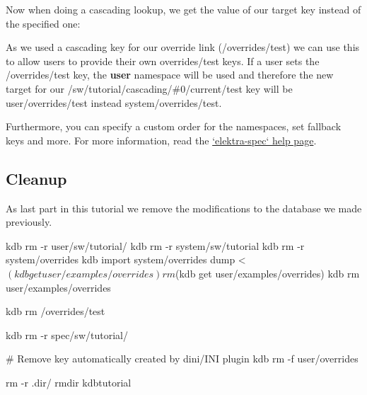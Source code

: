 Now when doing a cascading lookup, we get the value of our target key instead of the specified one\+:




As we used a cascading key for our override link ({\ttfamily /overrides/test}) we can use this to allow users to provide their own {\ttfamily overrides/test} keys. If a user sets the {\ttfamily /overrides/test} key, the {\bfseries user} namespace will be used and therefore the new target for our {\ttfamily /sw/tutorial/cascading/\#0/current/test} key will be {\ttfamily user/overrides/test} instead {\ttfamily system/overrides/test}.




Furthermore, you can specify a custom order for the namespaces, set fallback keys and more. For more information, read the \hyperlink{md_doc_help_elektra-spec_doc_help_elektra-spec_md}{`elektra-\/spec` help page}.

\subsection*{Cleanup}

As last part in this tutorial we remove the modifications to the database we made previously.


\begin{DoxyCode}
kdb rm -r user/sw/tutorial/
kdb rm -r system/sw/tutorial
kdb rm -r system/overrides
kdb import system/overrides dump < $(kdb get user/examples/overrides)
rm $(kdb get user/examples/overrides)
kdb rm user/examples/overrides

kdb rm /overrides/test

kdb rm -r spec/sw/tutorial/

# Remove key automatically created by dini/INI plugin
kdb rm -f user/overrides

rm -r .dir/
rmdir kdbtutorial
\end{DoxyCode}
 